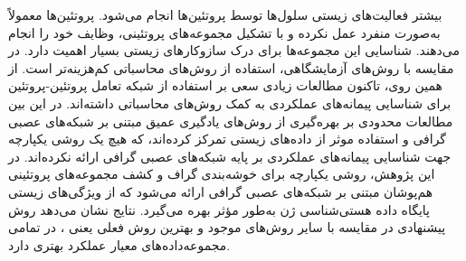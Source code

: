 بیشتر فعالیت‌های زیستی سلول‌ها توسط پروتئین‌ها انجام می‌شود. پروتئین‌ها معمولاً به‌صورت منفرد عمل نکرده و با تشکیل مجموعه‌های پروتئینی، وظایف خود را انجام می‌دهند. شناسایی این مجموعه‌ها برای درک سازوکارهای زیستی بسیار اهمیت دارد. در مقایسه با روش‌های آزمایشگاهی، استفاده از روش‌های محاسباتی کم‌هزینه‌تر است. از همین روی، تاکنون مطالعات زیادی سعی بر استفاده از شبکه تعامل پروتئین-پروتئین برای شناسایی پیمانه‌های عملکردی به کمک روش‌های محاسباتی داشته‌اند. در این بین مطالعات محدودی بر بهره‌گیری از روش‌های یادگیری عمیق مبتنی بر شبکه‌های عصبی گرافی و استفاده موثر از داده‌های زیستی تمرکز کرده‌اند، که هیچ یک روشی یکپارچه جهت شناسایی پیمانه‌های عملکردی بر پایه شبکه‌های عصبی گرافی ارائه نکرده‌اند. در این پژوهش، روشی یکپارچه برای خوشه‌بندی گراف و کشف مجموعه‌های پروتئینی هم‌پوشان مبتنی بر شبکه‌های عصبی گرافی ارائه می‌شود که از ویژگی‌های زیستی پایگاه داده هستی‌شناسی ژن به‌طور مؤثر بهره می‌گیرد. نتایج نشان می‌دهد روش پیشنهادی در مقایسه با سایر روش‌های موجود و بهترین روش‌ فعلی یعنی ، در تمامی مجموعه‌داده‌های معیار عملکرد بهتری دارد.    

